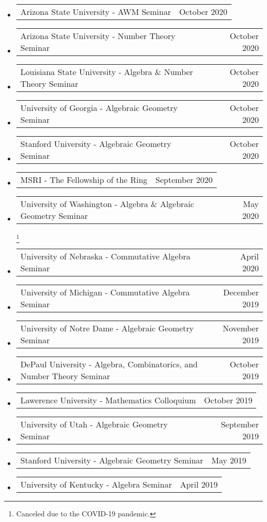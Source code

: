 \documentclass[letterpaper,11pt]{article}
\makeatletter
\newcommand{\ressubheadingTalk}[2]{
\begin{tabular*}{6.5in}[t]{l@{\cftdotfill{\cftsecdotsep}\extracolsep{\fill}}r}
		#1 & #2 \\
\end{tabular*}\vspace{-6pt}}
\makeatother
\begin{document}
\begin{itemize}
\item
	\ressubheadingTalk{Arizona State University - AWM Seminar}{October 2020}

\item
	\ressubheadingTalk{Arizona State University - Number Theory Seminar}{October 2020}

\item
	\ressubheadingTalk{Louisiana State University - Algebra \& Number Theory Seminar}{October 2020}
		
\item
	\ressubheadingTalk{University of Georgia - Algebraic Geometry Seminar}{October 2020}
	
\item
	\ressubheadingTalk{Stanford University - Algebraic Geometry Seminar}{October 2020}
	
\item
	\ressubheadingTalk{MSRI - The Fellowship of the Ring}{September 2020}
	
\item 
	\ressubheadingTalk{University of Washington - Algebra \& Algebraic Geometry Seminar}{May 2020}\footnote[2]{Canceled due to the COVID-19 pandemic.} 


\item 
	\ressubheadingTalk{University of Nebraska - Commutative Algebra Seminar}{April 2020}\footnotemark[2]

\item 
	\ressubheadingTalk{University of Michigan - Commutative Algebra Seminar}{December 2019}

\item
	\ressubheadingTalk{University of Notre Dame - Algebraic Geometry Seminar}{November 2019}

\item
	\ressubheadingTalk{DePaul University - Algebra, Combinatorics, and Number Theory Seminar}{October 2019}{}{}
	
\item
	\ressubheadingTalk{Lawerence University - Mathematics Colloquium}{October 2019}{}{}

\item
	\ressubheadingTalk{University of Utah - Algebraic Geometry Seminar}{September 2019}

\item
	\ressubheadingTalk{Stanford University - Algebraic Geometry Seminar}{May 2019}
	
\item
	\ressubheadingTalk{University of Kentucky - Algebra Seminar}{April 2019}
		

\end{itemize}
\end{document}
